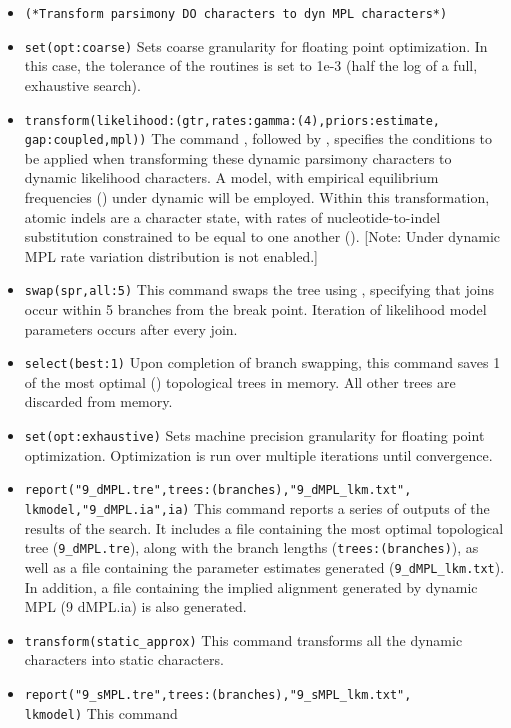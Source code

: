 \begin{itemize}
\item \texttt{(*Transform parsimony DO characters to dyn MPL characters*)}
\item \texttt{set(opt:coarse)} Sets coarse granularity for floating point optimization. In this case, the 
tolerance of the routines is set to 1e-3 (half the log of a full, exhaustive search).
\item \texttt{transform(likelihood:(gtr,rates:gamma:(4),priors:estimate,\\gap:coupled,mpl))} The command 
, followed by , specifies the conditions to be 
applied when transforming these dynamic parsimony characters to dynamic likelihood characters.  
A  model, with empirical equilibrium frequencies () 
under dynamic  will be employed. Within this transformation, atomic indels are 
a character state, with rates of nucleotide-to-indel substitution constrained to be equal to one another 
(). [Note: Under dynamic MPL rate variation distribution is not enabled.]
\item \texttt{swap(spr,all:5)} This command swaps the tree using , specifying that joins occur
within 5 branches from the break point. Iteration of likelihood model parameters occurs after every join.
\item \texttt{select(best:1)} Upon completion of branch swapping, this command saves 1 of the most optimal 
() topological trees in memory. All other trees are discarded from memory.
\item \texttt{set(opt:exhaustive)} Sets machine precision granularity for floating point optimization. 
Optimization is run over multiple iterations until convergence.
\item \texttt{report("9\_dMPL.tre",trees:(branches),"9\_dMPL\_lkm.txt",\\lkmodel,"9\_dMPL.ia",ia)} 
This command reports a series of outputs of the results of the search.
It includes a file containing the most optimal topological tree (\texttt{9\_dMPL.tre}), 
along with the branch lengths (\texttt{trees:(branches)}), as well as a file containing the parameter 
estimates generated (\texttt{9\_dMPL\_lkm.txt}).  In addition, a file containing the
implied alignment generated by dynamic MPL (9 dMPL.ia) is also generated.
\item \texttt{transform(static\_approx)} This command transforms all the dynamic characters into static characters.
\item \texttt{report("9\_sMPL.tre",trees:(branches),"9\_sMPL\_lkm.txt",\\lkmodel)} This command 

\end{itemize}
